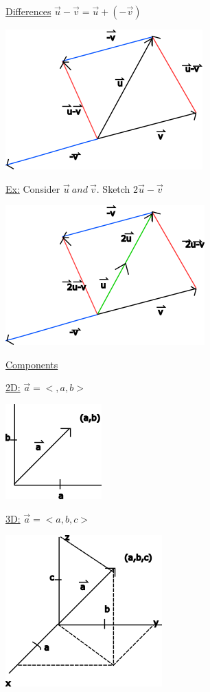 \documentclass[10pt]{article}
\begin{document}
\underline{Differences} $\vec{u} - \vec{v} = \vec{u} + (-\vec{v})$ 

\includegraphics{vectordifference}

\underline{Ex:} Consider $\vec{u}\ and\ \vec{v}   $. Sketch $2 \vec{u}-\vec{v}$  

\includegraphics{vectordifference2}

\bigskip
\underline{Components}

\underline{2D:} $\vec{a} = <,a,b> $

\includegraphics{vectorcomponents2d}

\underline{3D:} $\vec{a}=<a,b,c>  $

\includegraphics{vectorcomponents3d}
\end{document}
